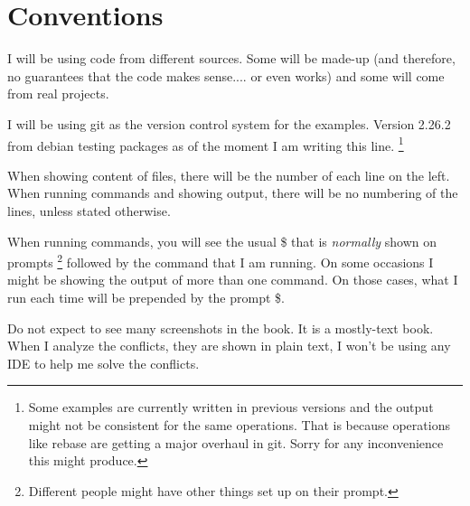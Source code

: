 
\section{Conventions}

I will be using code from different sources. Some will be made-up (and therefore, no guarantees that the code makes sense....
or even works) and some will come from real projects.

I will be using git as the version control system for the examples. Version 2.26.2 from debian testing packages as of the
moment I am writing this line. \footnote{Some examples are currently written in previous versions and the output might not
be consistent for the same operations. That is because operations like rebase are getting a major overhaul in git. Sorry for
any inconvenience this might produce.}

When showing content of files, there will be the number of each line on the left. When running commands and showing output, there
will be no numbering of the lines, unless stated otherwise.

When running commands, you will see the usual \$ that is {\it normally} shown on prompts \footnote{Different people might have other
things set up on their prompt.} followed by the command that I am running. On some occasions I might be showing the output of more
than one command. On those cases, what I run each time will be prepended by the prompt \$.

Do not expect to see many screenshots in the book. It is a mostly-text book. When I analyze the conflicts, they are shown in plain
text, I won't be using any IDE to help me solve the conflicts.

